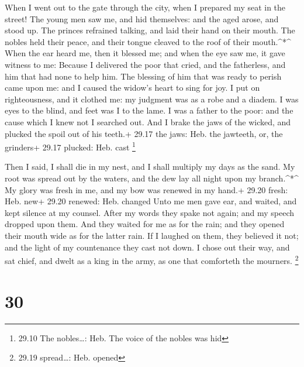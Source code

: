  When I went out to the gate through the city, when I
prepared my seat in the street!  The young men saw me, and
hid themselves: and the aged arose, and stood up.  The
princes refrained talking, and laid their hand on their mouth.
 The nobles held their peace, and their tongue cleaved to
the roof of their mouth.\^{}*\^{}  When the ear heard me,
then it blessed me; and when the eye saw me, it gave witness to me:
 Because I delivered the poor that cried, and the
fatherless, and him that had none to help him.  The
blessing of him that was ready to perish came upon me: and I caused the
widow's heart to sing for joy.  I put on righteousness, and
it clothed me: my judgment was as a robe and a diadem.  I
was eyes to the blind, and feet was I to the lame.  I was a
father to the poor: and the cause which I knew not I searched out.
 And I brake the jaws of the wicked, and plucked the spoil
out of his teeth.+ 29.17 the jaws: Heb. the jawteeth, or, the grinders+
29.17 plucked: Heb. cast \footnote{29.10 The nobles\ldots: Heb. The
  voice of the nobles was hid}

 Then I said, I shall die in my nest, and I shall multiply
my days as the sand.  My root was spread out by the waters,
and the dew lay all night upon my branch.\^{}*\^{}  My
glory was fresh in me, and my bow was renewed in my hand.+ 29.20 fresh:
Heb. new+ 29.20 renewed: Heb. changed  Unto me men gave
ear, and waited, and kept silence at my counsel.  After my
words they spake not again; and my speech dropped upon them.
 And they waited for me as for the rain; and they opened
their mouth wide as for the latter rain.  If I laughed on
them, they believed it not; and the light of my countenance they cast
not down.  I chose out their way, and sat chief, and dwelt
as a king in the army, as one that comforteth the mourners. \footnote{29.19
  spread\ldots: Heb. opened}

\hypertarget{section-29}{%
\section{30}\label{section-29}}

